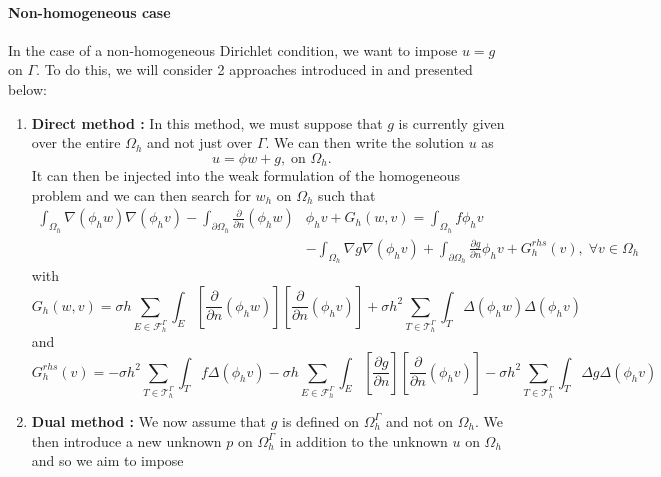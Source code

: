 \paragraph{Non-homogeneous case}

In the case of a non-homogeneous Dirichlet condition, we want to impose $u=g$ on $\Gamma$. To do this, we will consider 2 approaches introduced in \cite{cotin_phi-fem_nodate} and presented below:

\begin{enumerate}[label=\textbullet]
	\item \textbf{Direct method :} In this method, we must suppose that $g$ is currently given over the entire $\Omega_h$ and not just over $\Gamma$. We can then write the solution $u$ as
	\begin{equation*}
		u=\phi w +g, \; \text{on } \Omega_h.
	\end{equation*}
	It can then be injected into the weak formulation of the homogeneous problem and we can then search for $w_h$ on $\Omega_h$ such that
	\begin{align*}
		\int_{\Omega_h}\nabla(\phi_h w)\nabla(\phi_h v)-\int_{\partial\Omega_h}\frac{\partial}{\partial n}(\phi_h w)&\phi_h v+G_h(w,v)=\int_{\Omega_h}f\phi_h v \\
		&-\int_{\Omega_h}\nabla g\nabla(\phi_h v)+\int_{\partial\Omega_h}\frac{\partial g}{\partial n}\phi_h v+G_h^{rhs}(v), \; \forall v\in \Omega_h
	\end{align*}
	with
	\begin{equation*}
		G_h(w,v)=\sigma h\sum_{E\in\mathcal{F}_h^\Gamma}\int_E\left[\frac{\partial}{\partial n}(\phi_h w)\right]\left[\frac{\partial}{\partial n}(\phi_h v)\right]+\sigma h^2\sum_{T\in\mathcal{T}_h^\Gamma}\int_T \Delta(\phi_h w)\Delta(\phi_h v)
	\end{equation*}
	and
	\begin{equation*}
		G_h^{rhs}(v)=-\sigma h^2\sum_{T\in\mathcal{T}_h^\Gamma}\int_T f\Delta(\phi_h v)-\sigma h\sum_{E\in\mathcal{F}_h^\Gamma}\int_E\left[\frac{\partial g}{\partial n}\right]\left[\frac{\partial}{\partial n}(\phi_h v)\right]-\sigma h^2\sum_{T\in\mathcal{T}_h^\Gamma}\int_T \Delta g\Delta(\phi_h v)
	\end{equation*}
	\item \textbf{Dual method :} We now assume that $g$ is defined on $\Omega_h^\Gamma$ and not on $\Omega_h$. We then introduce a new unknown $p$ on $\Omega_h^\Gamma$ in addition to the unknown $u$ on $\Omega_h$ and so we aim to impose
	\begin{equation*}

\end{equation*}
\end{enumerate}
